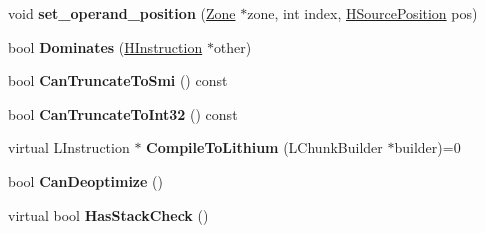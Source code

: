 \begin{DoxyCompactItemize}
\item 
\hypertarget{classv8_1_1internal_1_1_h_instruction_a0623f0bbb60a19d4165859b4e1190e71}{}void {\bfseries set\+\_\+operand\+\_\+position} (\hyperlink{classv8_1_1internal_1_1_zone}{Zone} $\ast$zone, int index, \hyperlink{classv8_1_1internal_1_1_h_source_position}{H\+Source\+Position} pos)\label{classv8_1_1internal_1_1_h_instruction_a0623f0bbb60a19d4165859b4e1190e71}

\item 
\hypertarget{classv8_1_1internal_1_1_h_instruction_a7cd697bfc5bdd48459eebcbd755b9242}{}bool {\bfseries Dominates} (\hyperlink{classv8_1_1internal_1_1_h_instruction}{H\+Instruction} $\ast$other)\label{classv8_1_1internal_1_1_h_instruction_a7cd697bfc5bdd48459eebcbd755b9242}

\item 
\hypertarget{classv8_1_1internal_1_1_h_instruction_acfd544bb90a73437660575233535b3ae}{}bool {\bfseries Can\+Truncate\+To\+Smi} () const \label{classv8_1_1internal_1_1_h_instruction_acfd544bb90a73437660575233535b3ae}

\item 
\hypertarget{classv8_1_1internal_1_1_h_instruction_af5a9f77ebff424833c6e25643743b32c}{}bool {\bfseries Can\+Truncate\+To\+Int32} () const \label{classv8_1_1internal_1_1_h_instruction_af5a9f77ebff424833c6e25643743b32c}

\item 
\hypertarget{classv8_1_1internal_1_1_h_instruction_a3428771211f74e7e291c6035503f35a2}{}virtual L\+Instruction $\ast$ {\bfseries Compile\+To\+Lithium} (L\+Chunk\+Builder $\ast$builder)=0\label{classv8_1_1internal_1_1_h_instruction_a3428771211f74e7e291c6035503f35a2}

\item 
\hypertarget{classv8_1_1internal_1_1_h_instruction_a1c8ab2a3554f77765809ef84915ba974}{}bool {\bfseries Can\+Deoptimize} ()\label{classv8_1_1internal_1_1_h_instruction_a1c8ab2a3554f77765809ef84915ba974}

\item 
\hypertarget{classv8_1_1internal_1_1_h_instruction_a0e461c3f454423764e87a9b2224bb518}{}virtual bool {\bfseries Has\+Stack\+Check} ()\label{classv8_1_1internal_1_1_h_instruction_a0e461c3f454423764e87a9b2224bb518}

\end{DoxyCompactItemize}
